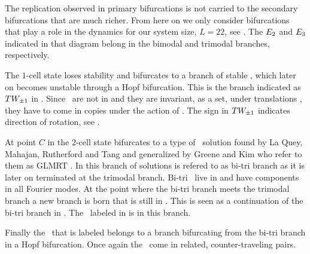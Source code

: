The replication observed in primary bifurcations is not carried to the secondary bifurcations that are
much richer. From here on we only consider bifurcations that play a role in the dynamics for our system size, $L=22$, see . The $E_{2}$ and $E_{3}$ indicated in that diagram belong
in the bimodal and trimodal branches, respectively.

The $1$-cell state loses stability and bifurcates to a branch of stable
\reqva, which later on becomes unstable through a Hopf bifurcation.
This is the branch indicated as $TW_{\pm1}$ in . Since \reqva\ are not in 
and they are invariant, as a set, under translations , they have to come in copies
under the action of . The sign in $TW_{\pm1}$ indicates direction of rotation, see .

At point $C$ in  the $2$-cell state
bifurcates to a type of \eqv\ solution found by La Quey,
Mahajan, Rutherford and Tang and generalized by
Greene and Kim who refer to them as GLMRT \eqva. In
 this branch of solutions is refered to as
bi-tri branch as it is later on terminated at the trimodal
branch. Bi-tri \eqva\ live in  and have components
in all Fourier modes. At the point where the bi-tri branch meets the
trimodal branch a new branch is born that is still in
. This is seen as a continuation of the bi-tri
branch in . The \eqv\ labeled  in
 is in this branch.

Finally the \reqv\ that is labeled  belongs to a branch bifurcating from the bi-tri branch in
a Hopf bifurcation. Once again the \reqva\ come in  related, counter-traveling pairs.




